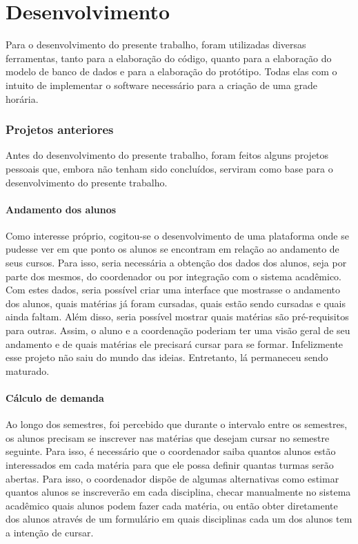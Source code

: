\chapter{Desenvolvimento}


Para o desenvolvimento do presente trabalho, foram utilizadas diversas ferramentas, tanto para a elaboração do código, quanto para a elaboração do modelo de banco de dados e para a elaboração do protótipo. Todas elas com o intuito de implementar o software necessário para a criação de uma grade horária.

\subsection{Projetos anteriores} %

    Antes do desenvolvimento do presente trabalho, foram feitos alguns projetos pessoais que, embora não tenham sido concluídos, serviram como base para o desenvolvimento do presente trabalho.

    \subsubsection{Andamento dos alunos} %

        Como interesse próprio, cogitou-se o desenvolvimento de uma plataforma onde se pudesse ver em que ponto os alunos se encontram em relação ao andamento de seus cursos. Para isso, seria necessária a obtenção dos dados dos alunos, seja por parte dos mesmos, do coordenador ou por integração com o sistema acadêmico. Com estes dados, seria possível criar uma interface que mostrasse o andamento dos alunos, quais matérias já foram cursadas, quais estão sendo cursadas e quais ainda faltam. Além disso, seria possível mostrar quais matérias são pré-requisitos para outras. Assim, o aluno e a coordenação poderiam ter uma visão geral de seu andamento e de quais matérias ele precisará cursar para se formar. Infelizmente esse projeto não saiu do mundo das ideias. Entretanto, lá permaneceu sendo maturado.

    \subsubsection{Cálculo de demanda} %

        Ao longo dos semestres, foi percebido que durante o intervalo entre os semestres, os alunos precisam se inscrever nas matérias que desejam cursar no semestre seguinte. Para isso, é necessário que o coordenador saiba quantos alunos estão interessados em cada matéria para que ele possa definir quantas turmas serão abertas. Para isso, o coordenador dispõe de algumas alternativas como estimar quantos alunos se inscreverão em cada disciplina, checar manualmente no sistema acadêmico quais alunos podem fazer cada matéria, ou então obter diretamente dos alunos através de um formulário em quais disciplinas cada um dos alunos tem a intenção de cursar.

